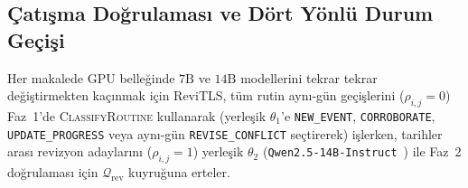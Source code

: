 ﻿\documentclass[journal]{IEEEtran}
\begin{document}
\subsection{\c{C}at{\i}\c{s}ma Do\u{g}rulamas{\i} ve D\"{o}rt Y\"{o}nl\"{u} Durum Ge\c{c}i\c{s}i}
\label{subsec:verification}

Her makalede GPU belle\u{g}inde $7\text{B}$ ve $14\text{B}$ modellerini tekrar tekrar de\u{g}i\c{s}tirmekten ka\c{c}{\i}nmak i\c{c}in ReviTLS, t\"{u}m rutin ayn{\i}-g\"{u}n ge\c{c}i\c{s}lerini ($\rho_{i,j}=0$) Faz~1'de \textsc{ClassifyRoutine} kullanarak (yerle\c{s}ik $\theta_1$'e \texttt{NEW\_EVENT}, \texttt{CORROBORATE}, \texttt{UPDATE\_PROGRESS} veya ayn{\i}-g\"{u}n \texttt{REVISE\_CONFLICT} se\c{c}tirerek) i\c{s}lerken, tarihler aras{\i} revizyon adaylar{\i}n{\i} ($\rho_{i,j}=1$) yerle\c{s}ik $\theta_2$ (\texttt{Qwen2.5-14B-Instruct}~\cite{qwen25}) ile Faz~2 do\u{g}rulamas{\i} i\c{c}in $\mathcal{Q}_{\text{rev}}$ kuyru\u{g}una erteler.
\end{document}
